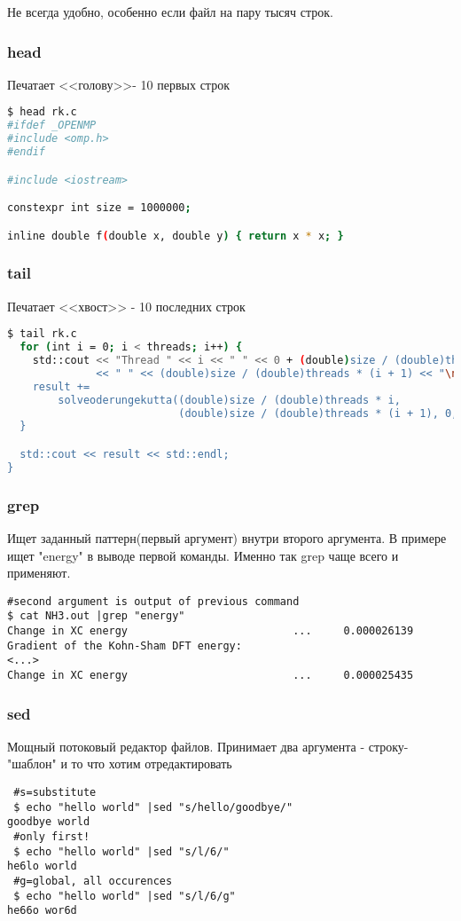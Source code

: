 \documentclass[11pt]{article}
\begin{document}
Не всегда удобно, особенно если файл на пару тысяч строк.
\subsubsection{head}
Печатает <<голову>>- 10 первых строк
\begin{lstlisting}[language=bash]
 $ head rk.c
#ifdef _OPENMP
#include <omp.h>
#endif

#include <iostream>

constexpr int size = 1000000;

inline double f(double x, double y) { return x * x; }
\end{lstlisting}

\subsubsection{tail}
Печатает <<хвост>> - 10 последних строк
\begin{lstlisting}[language=bash]
 $ tail rk.c
  for (int i = 0; i < threads; i++) {
    std::cout << "Thread " << i << " " << 0 + (double)size / (double)threads * i
              << " " << (double)size / (double)threads * (i + 1) << "\n";
    result +=
        solveoderungekutta((double)size / (double)threads * i,
                           (double)size / (double)threads * (i + 1), 0, 0.0001);
  }

  std::cout << result << std::endl;
}
\end{lstlisting}

\subsubsection{grep}

Ищет заданный паттерн(первый аргумент) внутри второго аргумента. В примере ищет "energy" в выводе первой команды. Именно так grep чаще всего и применяют.

\begin{lstlisting}
#second argument is output of previous command
$ cat NH3.out |grep "energy" 
Change in XC energy                          ...     0.000026139
Gradient of the Kohn-Sham DFT energy:
<...>
Change in XC energy                          ...     0.000025435

\end{lstlisting} 

\subsubsection{sed}
Мощный потоковый редактор файлов. Принимает два аргумента - строку-"шаблон" и то что хотим отредактировать
\begin{lstlisting}
 #s=substitute
 $ echo "hello world" |sed "s/hello/goodbye/"
goodbye world
 #only first!
 $ echo "hello world" |sed "s/l/6/"
he6lo world
 #g=global, all occurences
 $ echo "hello world" |sed "s/l/6/g"
he66o wor6d
\end{lstlisting}
\end{document}
